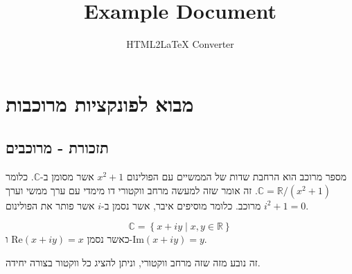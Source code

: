 \documentclass{tstextbook}
\begin{document}
\title{Example Document}
\author{HTML2LaTeX Converter}
\maketitle

\chapter{מבוא לפונקציות מרוכבות}

\section{תזכורת - מרוכבים}

מספר מרוכב הוא הרחבת שדות של הממשיים עם הפולינום \(x^2+1\) אשר מסומן ב-\(\mathbb{C}\). כלומר \(\mathbb{C}=\mathbb{R} / (x^2+1)\). זה אומר שזה למעשה מרחב ווקטורי דו מימדי עם ערך ממשי וערך מרוכב. כלומר מוסיפים איבר, אשר נסמן ב-\(i\) אשר פותר את הפולינום \(i^2+1=0\). 

\begin{proposition}
$$\mathbb{C}=\left\{  x+iy\mid x,y \in \mathbb{R}  \right\}$$
כאשר נסמן \(\mathrm{Re}(x+iy)=x\) ו-\(\mathrm{Im}(x+iy)=y\).

\end{proposition}
זה נובע מזה שזה מרחב ווקטורי, וניתן להציג כל ווקטור בצורה יחידה.
\end{document}
